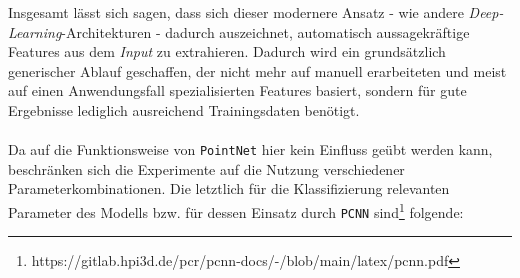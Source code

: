 Insgesamt lässt sich sagen, dass sich dieser modernere Ansatz - wie andere \textit{Deep-Learning}-Architekturen - dadurch auszeichnet, automatisch aussagekräftige Features aus dem \textit{Input} zu extrahieren. Dadurch wird ein grundsätzlich generischer Ablauf geschaffen, der nicht mehr auf manuell erarbeiteten und meist auf einen Anwendungsfall spezialisierten Features basiert, sondern für gute Ergebnisse lediglich ausreichend Trainingsdaten benötigt. \\\\
Da auf die Funktionsweise von \texttt{PointNet} hier kein Einfluss geübt werden kann, beschränken sich die Experimente auf die Nutzung verschiedener Parameterkombinationen. Die letztlich für die Klassifizierung relevanten Parameter des Modells bzw. für dessen Einsatz durch \texttt{PCNN} sind\footnote{https://gitlab.hpi3d.de/pcr/pcnn-docs/-/blob/main/latex/pcnn.pdf} folgende:
